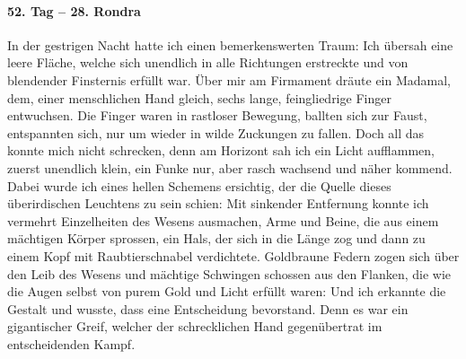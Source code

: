 \paragraph{52. Tag -- 28. Rondra}
In der gestrigen Nacht hatte ich einen bemerkenswerten Traum: Ich übersah eine leere Fläche, welche sich unendlich in alle Richtungen erstreckte und von blendender Finsternis erfüllt war. Über mir am Firmament dräute ein Madamal, dem, einer menschlichen Hand gleich, sechs lange, feingliedrige Finger entwuchsen. Die Finger waren in rastloser Bewegung, ballten sich zur Faust, entspannten sich, nur um wieder in wilde Zuckungen zu fallen. Doch all das konnte mich nicht schrecken, denn am Horizont sah ich ein Licht aufflammen, zuerst unendlich klein, ein Funke nur, aber rasch wachsend und näher kommend. Dabei wurde ich eines hellen Schemens ersichtig, der die Quelle dieses überirdischen Leuchtens zu sein schien: Mit sinkender Entfernung konnte ich vermehrt Einzelheiten des Wesens ausmachen, Arme und Beine, die aus einem mächtigen Körper sprossen, ein Hals, der sich in die Länge zog und dann zu einem Kopf mit Raubtierschnabel verdichtete. Goldbraune Federn zogen sich über den Leib des Wesens und mächtige Schwingen schossen aus den Flanken, die wie die Augen selbst von purem Gold und Licht erfüllt waren: Und ich erkannte die Gestalt und wusste, dass eine Entscheidung bevorstand. Denn es war ein gigantischer Greif, welcher der schrecklichen Hand gegenübertrat im entscheidenden Kampf.


